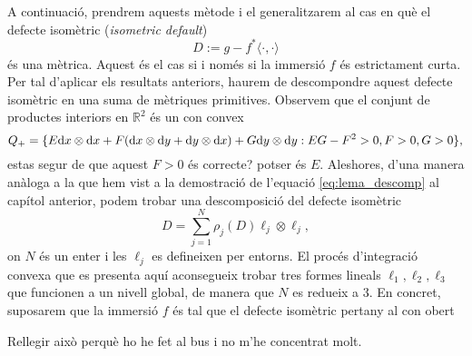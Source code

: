 A continuació, prendrem aquests mètode i el generalitzarem al cas en què el defecte isomètric (\textit{isometric default}) 
\begin{equation*}
    D:=g-f^*\langle\cdot, \cdot\rangle
\end{equation*}
és una mètrica. Aquest és el cas si i només si la immersió $f$ és estrictament curta. Per tal d'aplicar els resultats anteriors, haurem de descompondre aquest defecte isomètric en una suma de mètriques primitives. Observem que el conjunt de productes interiors en $\mathbb R^2$ és un con convex
\begin{equation*}
    Q_+ = \{E\text dx\otimes\text dx + F(\text dx\otimes\text dy + \text dy\otimes\text dx) + G\text dy\otimes\text dy : EG-F^2>0, F>0, G>0\},
\end{equation*}
{\color{blue} estas segur de que aquest $F>0$ és correcte? potser és $E$.}
Aleshores, d'una manera anàloga a la que hem vist a la demostració de l'equació \ref{eq:lema_descomp} al capítol anterior, podem trobar una descomposició del defecte isomètric
\begin{equation*}
    D = \sum_{j=1}^N \rho_j(D) \ell_j\otimes\ell_j,
\end{equation*}
on $N$ és un enter i les $\ell_j$ es defineixen per entorns. El procés d'integració convexa que es presenta aquí aconsegueix trobar tres formes lineals $\ell_1, \ell_2, \ell_3$ que funcionen a un nivell global, de manera que $N$ es redueix a $3$.
En concret, suposarem que la immersió $f$ és tal que el defecte isomètric pertany al con obert

{\color{blue}Rellegir això perquè ho he fet al bus i no m'he concentrat molt.}

